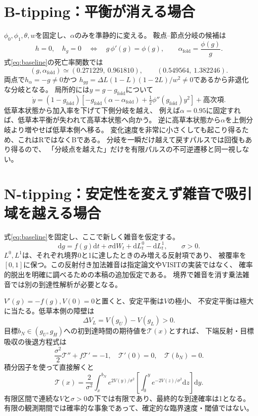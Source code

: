 \documentclass[a4paper,11pt]{ltjsarticle}
\newcommand{\dd}{\mathrm d}
\begin{document}
\section{B-tipping：平衡が消える場合}
$\phi_0,\phi_1,\theta,w$を固定し、$\alpha$のみを準静的に変える。
鞍点--節点分岐の候補は
\begin{equation}
 h=0,\quad h_g=0
 \quad\Longleftrightarrow\quad
 g\,\phi'(g)=\phi(g),\qquad
 \alpha_{\mathrm{fold}}=\frac{\phi(g)}g. \label{eq:fold}
\end{equation}
式\eqref{eq:baseline}の死亡率関数では
\[
 (g,\alpha_{\mathrm{fold}})\simeq
 (0.271229,\ 0.961810),\qquad
 (0.549564,\ 1.382246).
\]
両点で$h_\alpha=-g\ne0$かつ
$h_{gg}=\Delta L(1-L)(1-2L)/w^2\ne0$であるから非退化な分岐となる。
局所的には$y=g-g_{\mathrm{fold}}$について
\begin{equation}
 \dot y=(1-g_{\mathrm{fold}})\left[
 -g_{\mathrm{fold}}(\alpha-\alpha_{\mathrm{fold}})
 +\tfrac12\phi''(g_{\mathrm{fold}})y^2\right]+\text{高次項}.
\end{equation}
低草本状態から加入率を下げて下側分岐を越え、
例えば$\alpha=0.95$に固定すれば、低草本平衡が失われて高草本状態へ向かう。
逆に高草本状態から$\alpha$を上側分岐より増やせば低草本側へ移る。
変化速度を非常に小さくしても起こり得るため、これはRではなくBである。
分岐を一瞬だけ越えて戻すパルスでは回復もあり得るので、
「分岐点を越えた」だけを有限パルスの不可逆遷移と同一視しない。

\section{N-tipping：安定性を変えず雑音で吸引域を越える場合}
式\eqref{eq:baseline}を固定し、ここで新しく雑音を仮定する。
\begin{equation}
 \dd g=f(g)\dd t+\sigma\dd W_t+\dd L_t^0-\dd L_t^1,\qquad \sigma>0.
 \label{eq:sde}
\end{equation}
$L^0,L^1$は、それぞれ境界0と1に達したときのみ増える反射項であり、
被覆率を$[0,1]$に保つ。この反射付き加法雑音は指定論文やVISITの実装ではなく、
確率的脱出を明確に調べるための本稿の追加仮定である。
境界で雑音を消す乗法雑音では別の到達性解析が必要となる。

$V'(g)=-f(g),V(0)=0$と置くと、安定平衡は$V$の極小、
不安定平衡は極大に当たる。低草本側の障壁は
\[
 \Delta V_L=V(g_U)-V(g_L)>0.
\]
目標$b_N\in(g_U,g_H)$への初到達時間の期待値を$\mathcal T(x)$とすれば、
下端反射・目標吸収の後退方程式は
\begin{equation}
 \frac{\sigma^2}{2}\mathcal T''+f\mathcal T'=-1,\quad
 \mathcal T'(0)=0,\quad \mathcal T(b_N)=0.
\end{equation}
積分因子を使って直接解くと
\begin{equation}
 \mathcal T(x)=\frac{2}{\sigma^2}
 \int_x^{b_N}e^{2V(y)/\sigma^2}
 \left[\int_0^y e^{-2V(z)/\sigma^2}\dd z\right]\dd y.
 \label{eq:mfpt}
\end{equation}
有限区間で連続な$V$と$\sigma>0$の下では有限であり、最終的な到達確率は1となる。
有限の観測期間では確率的な事象であって、確定的な臨界速度・閾値ではない。
\end{document}
